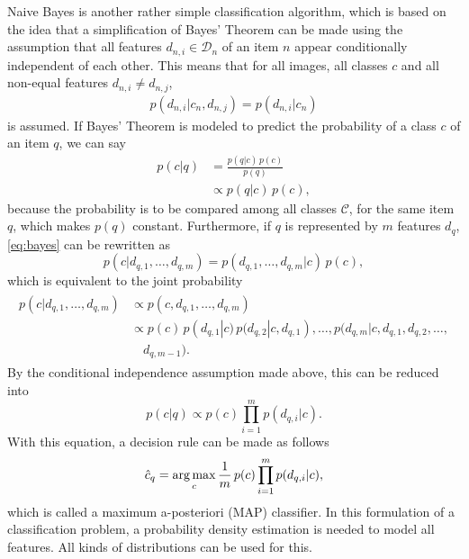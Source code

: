 Naive Bayes is another rather simple classification algorithm, which is based on the idea that a simplification of Bayes' Theorem can be made using the assumption that all features $d_{n,i} \in \mathcal{D}_n$ of an item $n$ appear conditionally independent of each other. This means that for all images, all classes $c$ and all non-equal features $d_{n,i} \neq d_{n,j}$, 
\begin{align}
    p(d_{n,i} | c_n, d_{n,j}) = p(d_{n,i}|c_n)
\end{align}
is assumed.
If Bayes' Theorem is modeled to predict the probability of a class $c$ of an item $q$, we can say
\begin{align}
    \label{eq:bayes}
    p(c|q)      &= \frac{p(q|c)\,p(c)}{p(q)}\\
                &\propto p(q|c)\,p(c),
\end{align}
because the probability is to be compared among all classes $\mathcal{C}$, for the same item $q$, which makes $p(q)$ constant. Furthermore, if $q$ is represented by $m$ features $d_q$, \eqref{eq:bayes} can be rewritten as
\begin{equation}
    p(c|d_{q,1},\dotsc,d_{q,m}) = p(d_{q,1}, \dotsc,d_{q,m}|c)\,p(c),
\end{equation}
which is equivalent to the joint probability
\begin{align}\begin{split}
    p(c|d_{q,1},\dotsc,d_{q,m}) &\propto p(c,d_{q,1}, \dotsc,d_{q,m})\\
        &\propto p(c)\,p(d_{q,1}|c)\, p(d_{q,2}|c,d_{q,1}), \dotsc,p(d_{q,m}|c,d_{q,1},d_{q,2},\dotsc,\\&\quad d_{q,m-1}).
    \end{split} 
\end{align}
By the conditional independence assumption made above, this can be reduced into
\begin{equation}
    p(c|q) \propto p(c)\prod_{i=1}^m p(d_{q,i}|c).
\end{equation}
With this equation, a decision rule can be made as follows
\begin{equation} \label{eq:map}
    \hat c_q = \operatorname*{arg\,max}_c \frac{1}{m}\,p(c)\prod_{i=1}^m p(d_{q,i}|c),
\end{equation}
which is called a maximum a-posteriori (MAP) classifier. In this formulation of a classification problem, a probability density estimation is needed to model all features. All kinds of distributions can be used for this.

